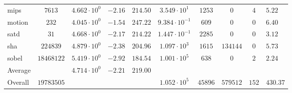 \begin{tabular}{|l|c|HHc|c|c|c|cH|}
mips          & $ 7613     $ & $ 4.662 \cdot 10^{0} $ & $ -2.16 $ & $ 214.50 $ & $ 3.549 \cdot 10^{1}  $ & $ 1253  $ & $ 0      $ & $ 4   $ & $ 5.22    $ \\
motion        & $ 232      $ & $ 4.045 \cdot 10^{0} $ & $ -1.54 $ & $ 247.22 $ & $ 9.384 \cdot 10^{-1} $ & $ 609   $ & $ 0      $ & $ 0   $ & $ 6.40    $ \\
satd          & $ 31       $ & $ 4.668 \cdot 10^{0} $ & $ -2.17 $ & $ 214.22 $ & $ 1.447 \cdot 10^{-1} $ & $ 2285  $ & $ 0      $ & $ 0   $ & $ 3.12    $ \\
sha           & $ 224839   $ & $ 4.879 \cdot 10^{0} $ & $ -2.38 $ & $ 204.96 $ & $ 1.097 \cdot 10^{3}  $ & $ 1615  $ & $ 134144 $ & $ 0   $ & $ 5.73    $ \\
sobel         & $ 18468122 $ & $ 5.419 \cdot 10^{0} $ & $ -2.92 $ & $ 184.54 $ & $ 1.001 \cdot 10^{5}  $ & $ 638   $ & $ 0      $ & $ 2   $ & $ 2.24    $ \\
\hline
Average       & $          $ & $ 4.714 \cdot 10^{0} $ & $ -2.21 $ & $ 219.00 $ & $                     $ & $       $ & $        $ & $     $ & $         $ \\
\hline
Overall       & $ 19783505 $ & $                    $ & $       $ & $        $ & $ 1.052 \cdot 10^{5}  $ & $ 45896 $ & $ 579512 $ & $ 152 $ & $ 430.37  $ \\
\hline
\end{tabular}
